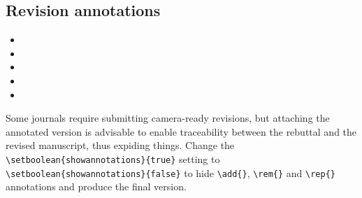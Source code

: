 \documentclass{article}
\begin{document}
\subsection{Revision annotations}

\begin{itemize}
    \item {}
    \item {}
    \item {}
    \item {}
    \item {}
    
\end{itemize}

Some journals require submitting camera-ready revisions, but attaching the annotated version is advisable to enable traceability between the rebuttal and the revised manuscript, thus expiding things. Change the \verb|\setboolean{showannotations}{true}| setting to \verb|\setboolean{showannotations}{false}| to hide \verb|\add{}|, \verb|\rem{}| and \verb|\rep{}| annotations and produce the final version.



\end{document}
